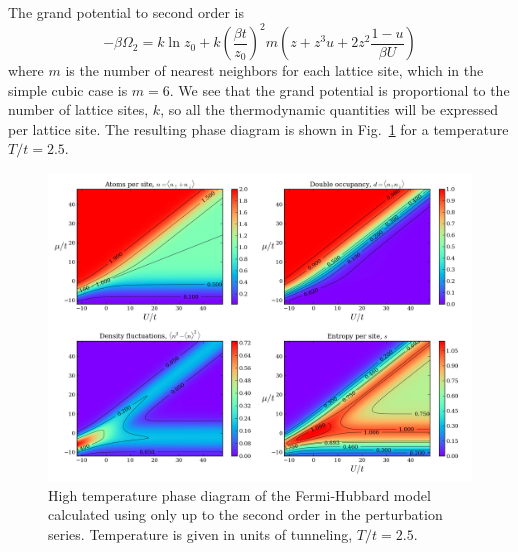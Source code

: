 \documentclass[11pt,letter]{article}
\begin{document}
The grand potential to second order is~\cite{Henderson1992,Jordens2010} 
\begin{equation}
-\beta \Omega_{2} = k \ln z_{0} + k \left( \frac{\beta t }{z_{0}} \right)^{2} m 
        \left( z + z^{3} u + 2z^{2} \frac{1-u}{\beta U} \right) 
\end{equation} 
where $m$ is the number of nearest neighbors for each lattice site, which in
the simple cubic case is $m=6$.  We see that the grand potential is
proportional to the number of lattice sites, $k$, so  all the
thermodynamic quantities will be expressed per lattice site.  The resulting
phase diagram is shown in Fig.~\ref{fig:highTphases} for a temperature
$T/t=2.5$.  
\begin{figure}
\centering \includegraphics[width=\textwidth]{../HubbardPhaseDiagram_figures/HTSE_phasesT025.png}
\caption[High temperature phase diagram of the Fermi-Hubbard model]{\small High
temperature phase diagram of the Fermi-Hubbard model calculated using only up
to the second order in the perturbation series.  Temperature is given in units
of tunneling,  $T/t=2.5$. } \label{fig:highTphases}
\end{figure}
\end{document}
